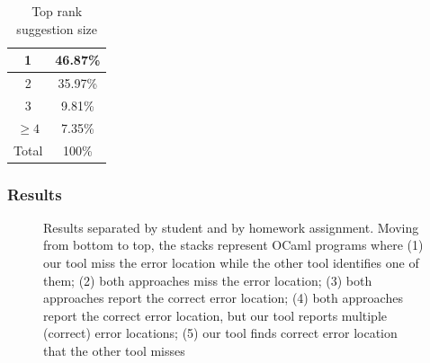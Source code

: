 \begin{table}
\centering
\begin{tabular}{|c | c|}
\hline
1 & 46.87\% \\
\hline
2 & 35.97\% \\
\hline
3 & 9.81\% \\
\hline
$\geq 4$ & 7.35\% \\
\hline
Total & 100\% \\
\hline
\end{tabular}
\caption{Top rank suggestion size}
\label{table:groupsize}
\end{table}

\subsubsection{Results}

\begin{figure}
\begin{center}
%
\end{center}
\caption{Results separated by student and by homework assignment.
Moving from bottom to top, the stacks represent OCaml programs where
%
(1) our tool miss the error location while the other tool identifies
one of them; 
%
(2) both approaches miss the error location; 
%
(3) both approaches report the correct error location; 
%
(4) both approaches report the correct error location, but our tool
reports multiple (correct) error locations; 
%
(5) our tool finds correct error location that the other tool misses} 
\label{fig:ocamlresult}
\end{figure}

